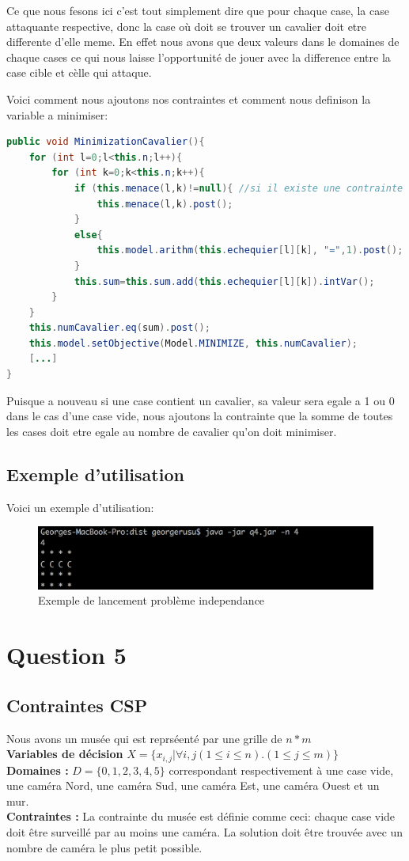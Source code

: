 \documentclass[a4paper,10pt]{article}
\begin{document}
Ce que nous fesons ici c'est tout simplement dire que pour chaque case, la case attaquante respective, donc la case où doit se trouver un cavalier doit etre differente d'elle meme. En effet nous avons que deux valeurs dans le domaines de chaque cases ce qui nous laisse l'opportunité de jouer avec la difference entre la case cible et cèlle qui attaque.

Voici comment nous ajoutons nos contraintes et comment nous definison la variable a minimiser:
\begin{lstlisting}[language=Java,basicstyle=\tiny]
public void MinimizationCavalier(){
	for (int l=0;l<this.n;l++){
		for (int k=0;k<this.n;k++){
			if (this.menace(l,k)!=null){ //si il existe une contrainte
				this.menace(l,k).post();
			}
			else{
				this.model.arithm(this.echequier[l][k], "=",1).post(); //sinon c'est une case occupe ->cavalier
			}
			this.sum=this.sum.add(this.echequier[l][k]).intVar();
		}	
	}
	this.numCavalier.eq(sum).post();
	this.model.setObjective(Model.MINIMIZE, this.numCavalier);
	[...]
}
\end{lstlisting}

Puisque a nouveau si une case contient un cavalier, sa valeur sera egale a 1 ou 0 dans le cas d'une case vide, nous ajoutons la contrainte que la somme de toutes les cases doit etre egale au nombre de cavalier qu'on doit minimiser.

\subsection{Exemple d'utilisation}
Voici un exemple d'utilisation:
\begin{figure}[!h]
  \includegraphics[width=\linewidth]{img/q4.png}
  \caption{Exemple de lancement problème independance}
\end{figure}

\section{Question 5}
\subsection{Contraintes CSP}
	Nous avons un musée qui est reprséenté par une grille de $n * m$\\
	\textbf {Variables de décision} $ X = \{x_{i,j} | \forall i,j (1 \leq i \leq n).(1 \leq j \leq m)\}$\\
	\textbf{Domaines : } $ D = \{0, 1, 2, 3, 4, 5\} $ correspondant respectivement à une case vide, une caméra Nord, une caméra Sud, une caméra Est, une caméra Ouest et un mur.\\
	\textbf{Contraintes : } La contrainte du musée est définie comme ceci: chaque case vide doit être surveillé par au moins une caméra. La solution doit être trouvée avec un nombre de caméra le plus petit possible.
\end{document}
